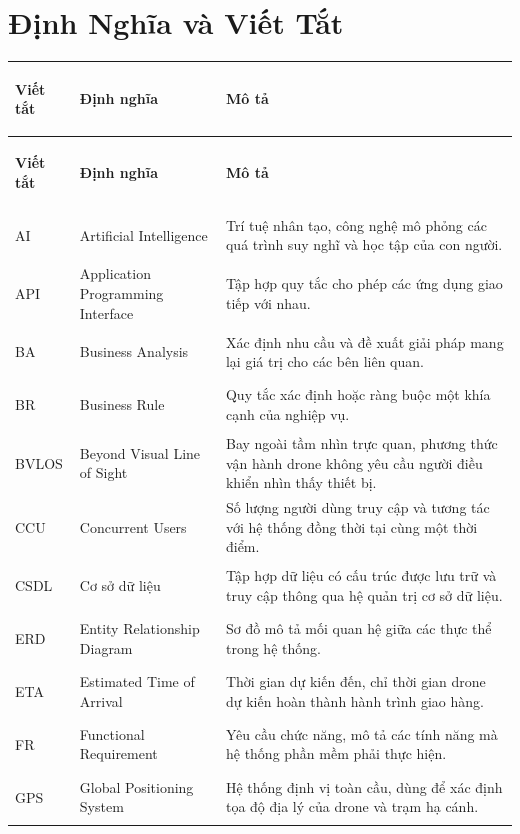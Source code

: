\chapter*{Định Nghĩa và Viết Tắt}

\begin{longtable}{|>{\bfseries\raggedright\arraybackslash}p{1.5cm}|>{\raggedright\arraybackslash}p{5.0cm}|>{\raggedright\arraybackslash}p{7.5cm}|}
  \hline
  \textbf{Viết tắt} & \textbf{Định nghĩa} & \textbf{Mô tả} \\
  \hline
  \endfirsthead
  \hline
  \textbf{Viết tắt} & \textbf{Định nghĩa} & \textbf{Mô tả} \\
  \hline
  \endhead
  \hline
  \endfoot
  \hline
  \endlastfoot
  AI    & Artificial Intelligence &
         Trí tuệ nhân tạo, công nghệ mô phỏng các quá trình suy nghĩ và học tập của con người. \\ \hline
  API   & Application Programming Interface &
         Tập hợp quy tắc cho phép các ứng dụng giao tiếp với nhau. \\ \hline
  BA    & Business Analysis &
         Xác định nhu cầu và đề xuất giải pháp mang lại giá trị cho các bên liên quan. \\ \hline
  BR    & Business Rule &
         Quy tắc xác định hoặc ràng buộc một khía cạnh của nghiệp vụ. \\ \hline
  BVLOS & Beyond Visual Line of Sight &
         Bay ngoài tầm nhìn trực quan, phương thức vận hành drone không yêu cầu người điều khiển nhìn thấy thiết bị. \\ \hline
  CCU   & Concurrent Users &
         Số lượng người dùng truy cập và tương tác với hệ thống đồng thời tại cùng một thời điểm. \\ \hline
  CSDL  & Cơ sở dữ liệu &
         Tập hợp dữ liệu có cấu trúc được lưu trữ và truy cập thông qua hệ quản trị cơ sở dữ liệu. \\ \hline

  ERD   & Entity Relationship Diagram &
         Sơ đồ mô tả mối quan hệ giữa các thực thể trong hệ thống. \\ \hline
  ETA   & Estimated Time of Arrival &
         Thời gian dự kiến đến, chỉ thời gian drone dự kiến hoàn thành hành trình giao hàng. \\ \hline
  FR    & Functional Requirement &
         Yêu cầu chức năng, mô tả các tính năng mà hệ thống phần mềm phải thực hiện. \\ \hline
  GPS   & Global Positioning System &
         Hệ thống định vị toàn cầu, dùng để xác định tọa độ địa lý của drone và trạm hạ cánh. \\ \hline


\end{longtable}
